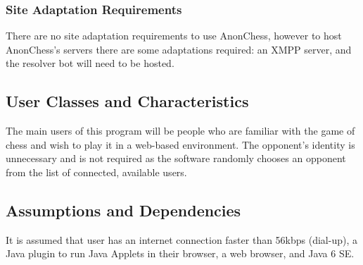 \subsubsection{Site Adaptation Requirements}
There are no site adaptation requirements to use AnonChess, however to host AnonChess's servers there are some adaptations required: an XMPP server, and the resolver bot will need to be hosted.

\subsection{User Classes and Characteristics}
The main users of this program will be people who are familiar with the game of chess and wish to play it in a web-based environment. The opponent's identity is unnecessary and is not required as the software randomly chooses an opponent from the list of connected, available users.

\subsection{Assumptions and Dependencies}
It is assumed that user has an internet connection faster than 56kbps (dial-up), a Java plugin to run Java Applets in their browser, a web browser, and Java 6 SE.
